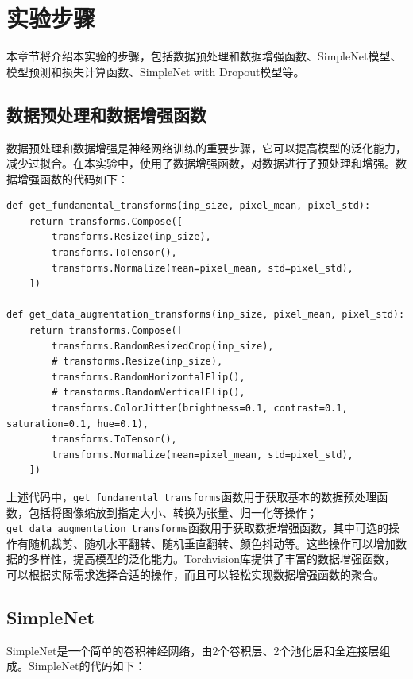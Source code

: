 \section{实验步骤}

本章节将介绍本实验的步骤，包括数据预处理和数据增强函数、SimpleNet模型、模型预测和损失计算函数、SimpleNet with Dropout模型等。

\subsection{数据预处理和数据增强函数}

数据预处理和数据增强是神经网络训练的重要步骤，它可以提高模型的泛化能力，减少过拟合。在本实验中，使用了数据增强函数，对数据进行了预处理和增强。数据增强函数的代码如下：

\begin{lstlisting}[style=Python]
def get_fundamental_transforms(inp_size, pixel_mean, pixel_std):
    return transforms.Compose([
        transforms.Resize(inp_size),
        transforms.ToTensor(),
        transforms.Normalize(mean=pixel_mean, std=pixel_std),
    ])

def get_data_augmentation_transforms(inp_size, pixel_mean, pixel_std):
    return transforms.Compose([
        transforms.RandomResizedCrop(inp_size),
        # transforms.Resize(inp_size),
        transforms.RandomHorizontalFlip(),
        # transforms.RandomVerticalFlip(),
        transforms.ColorJitter(brightness=0.1, contrast=0.1, saturation=0.1, hue=0.1),
        transforms.ToTensor(),
        transforms.Normalize(mean=pixel_mean, std=pixel_std),
    ])
\end{lstlisting}

上述代码中，\texttt{get\_fundamental\_transforms}函数用于获取基本的数据预处理函数，包括将图像缩放到指定大小、转换为张量、归一化等操作；\texttt{get\_data\_augmentation\_transforms}函数用于获取数据增强函数，其中可选的操作有随机裁剪、随机水平翻转、随机垂直翻转、颜色抖动等。这些操作可以增加数据的多样性，提高模型的泛化能力。Torchvision库提供了丰富的数据增强函数，可以根据实际需求选择合适的操作，而且可以轻松实现数据增强函数的聚合。

\subsection{SimpleNet}

SimpleNet是一个简单的卷积神经网络，由2个卷积层、2个池化层和全连接层组成。SimpleNet的代码如下：

